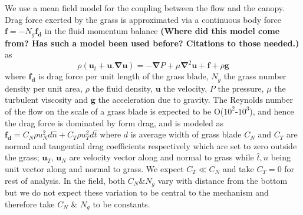 \documentclass[aps,prl,twocolumn,showpacs,superscriptaddress,groupedaddress,10pt]{revtex4-1}  %
\newcommand{\bu}{\mathbf{u}}
\newcommand{\grad}{\mathbf{\nabla}}
\newcommand{\shreyas}[1]{{\bf (#1)}}
\begin{document}
We use a mean field model for the coupling between the flow and the canopy. Drag force exerted by the grass is approximated via a 
continuous body force $\mathbf{f}=-N_g\mathbf{f_d}$ in the fluid momentum balance\cite{Vivoni98,Nepf99,Ghisal02,Delangre04,Delangre06} \shreyas{Where did this model come from? Has such a model been used before? Citations to those needed.} as
\begin{equation}
\rho \left(\bu_{t}+\bu.\grad\bu \right) = -\grad P+\mu\grad^{2}\bu +\mathbf{f}+\rho\mathbf{g}
\label{navier-stokes}
\end{equation}
where $\mathbf{f_{d}}$ is drag force per unit length of the grass blade, $N_g$ the grass number density per unit area, $\rho$ the fluid density, $\mathbf{u}$ the velocity, 
$P$ the pressure, $\mu$ the turbulent viscosity and $\mathbf{g}$ the acceleration due to gravity. The Reynolds number of the flow on the scale of a grass blade is expected to be O($10^2$-$10^3$), and hence the drag force is dominated by form drag, and is modeled 
as $\mathbf{f_{d}}=C_N \rho u_{N}^{2}d\hat{n}+C_{T}\rho u_{T}^{2}d\hat{t}$ where $d$ is average width of grass blade
$C_{N}$ and $C_{T}$ are normal and tangential drag coefficients respectively which are set to zero outside the grass; $\bu_{T}$, $\bu_{N}$ are velocity vector along and
normal to grass while $\hat{t},\hat{n}$ being unit vector along and normal to grass. We expect $C_T \ll C_N$ and take $C_T=0$ for rest of analysis. In the field, both $C_N \& N_g$ vary with distance from the bottom but we do not expect these variation to be central to the mechanism and therefore take $C_N$ \& $N_g$ to be constants.
\end{document}

